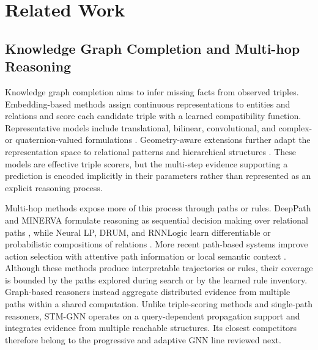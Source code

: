 \documentclass[a4paper,fleqn]{cas-sc}
\begin{document}


\section{Related Work}\label{sec:related_work}

\subsection{Knowledge Graph Completion and Multi-hop Reasoning}
\label{subsec:kg_reasoning}

Knowledge graph completion aims to infer missing facts from observed triples.
Embedding-based methods assign continuous representations to entities and
relations and score each candidate triple with a learned compatibility
function. Representative models include translational, bilinear, convolutional,
and complex- or quaternion-valued formulations
\citep{bordes2013transe,trouillon2016complex,dettmers2018convolutional,
sun2019rotate,zhang2019quaternion}. Geometry-aware extensions further adapt the
representation space to relational patterns and hierarchical structures
\citep{wang2023hygge}. These models are effective triple scorers, but the
multi-step evidence supporting a prediction is encoded implicitly in their
parameters rather than represented as an explicit reasoning process.

Multi-hop methods expose more of this process through paths or rules. DeepPath
and MINERVA formulate reasoning as sequential decision making over relational
paths \citep{xiong2017deeppath,das2018minerva}, while Neural LP, DRUM, and
RNNLogic learn differentiable or probabilistic compositions of relations
\citep{yang2017neurallp,sadeghian2019drum,qu2020rnnlogic}. More recent path-based
systems improve action selection with attentive path information or local
semantic context \citep{shang2024attention,wang2025losa}. Although these methods
produce interpretable trajectories or rules, their coverage is bounded by the
paths explored during search or by the learned rule inventory. Graph-based
reasoners instead aggregate distributed evidence from multiple paths within a
shared computation. Unlike triple-scoring methods and single-path reasoners,
STM-GNN operates on a query-dependent propagation support and integrates
evidence from multiple reachable structures. Its closest competitors therefore
belong to the progressive and adaptive GNN line reviewed next.
\end{document}
